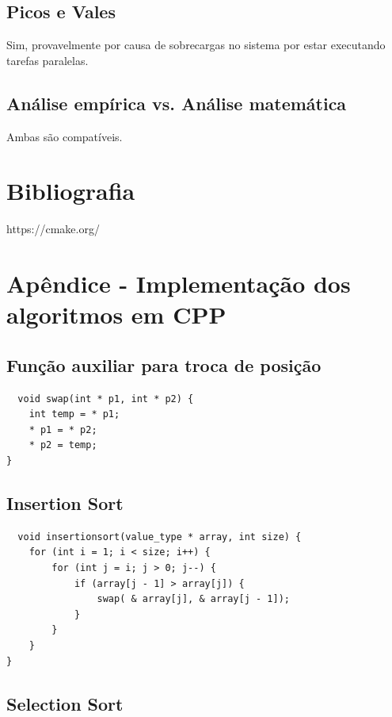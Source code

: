\documentclass[a4paper, 12pt]{article}
\begin{document}
	\subsection{Picos e Vales}
		Sim, provavelmente por causa de sobrecargas no sistema por estar executando tarefas paralelas.
	\subsection{Análise empírica vs. Análise matemática}
		Ambas são compatíveis.
		
		
	\newpage

	
	\section*{Bibliografia}
	\footnotesize{
		
		\noindent https://cmake.org/\\
		
	}
	\newpage
	\section*{Apêndice - Implementação dos algoritmos em CPP}



		\subsection{Função auxiliar para troca de posição}

	\begin{lstlisting}
  void swap(int * p1, int * p2) {
	int temp = * p1;
	* p1 = * p2;
	* p2 = temp;
}
	\end{lstlisting}


		\subsection{Insertion Sort}

\begin{lstlisting}
  void insertionsort(value_type * array, int size) {
	for (int i = 1; i < size; i++) {
		for (int j = i; j > 0; j--) {
			if (array[j - 1] > array[j]) {
				swap( & array[j], & array[j - 1]);
			}
		}
	}
}
\end{lstlisting}



	\subsection{Selection Sort}
\end{document}
